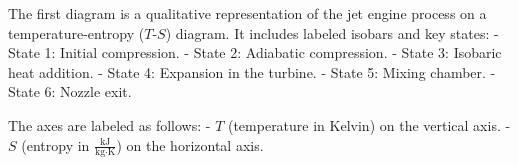 The first diagram is a qualitative representation of the jet engine process on a temperature-entropy (\( T \)-\( S \)) diagram. It includes labeled isobars and key states:  
- State 1: Initial compression.  
- State 2: Adiabatic compression.  
- State 3: Isobaric heat addition.  
- State 4: Expansion in the turbine.  
- State 5: Mixing chamber.  
- State 6: Nozzle exit.  

The axes are labeled as follows:  
- \( T \) (temperature in Kelvin) on the vertical axis.  
- \( S \) (entropy in \( \frac{\text{kJ}}{\text{kg·K}} \)) on the horizontal axis.